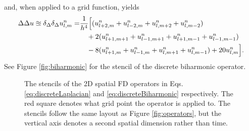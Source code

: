 and, when applied to a grid function, yields
\begin{equation}\nonumber
    \begin{aligned}
    \Delta\Delta u\approxeq\delta_{\Delta}\delta_{\Delta} u_{l,m}^n =&\frac{1}{h^4}\Big[(u_{l+2, m}^n + u_{l-2, m}^n+u_{l, m+2}^n+u_{l, m-2}^n)\\
    &\ \ \ +2(u_{l+1, m+1}^n + u_{l-1, m+1}^n+u_{l+1, m-1}^n+u_{l-1, m-1}^n)\\
    &\ \ \ -8(u_{l+1, m}^n + u_{l-1, m}^n+u_{l, m+1}^n+u_{l, m-1}^n) + 20u_{l,m}^n\Big].
    \end{aligned}
\end{equation}
See Figure \ref{fig:biharmonic} for the stencil of the discrete biharmonic operator.
\begin{figure}[h]
    \centering
    \hspace{0.06\textwidth}
    \caption{The stencils of the 2D spatial FD operators in Eqs. \eqref{eq:discreteLaplacian} and \eqref{eq:discreteBiharmonic} respectively. The red square denotes what grid point the operator is applied to. The stencils follow the same layout as Figure \ref{fig:operators}, but the vertical axis denotes a second spatial dimension rather than time. \label{fig:2Doperators}}
\end{figure}


